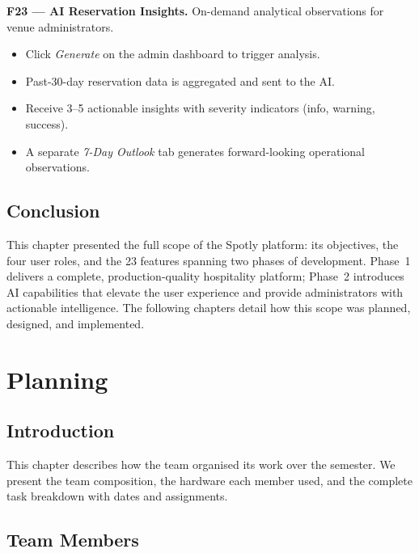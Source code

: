 \documentclass[12pt,a4paper,oneside]{report}
\begin{document}
\textbf{F23 --- AI Reservation Insights.}
On-demand analytical observations for venue administrators.
\begin{itemize}[leftmargin=1.5em, topsep=2pt, itemsep=1pt]
  \item Click \emph{Generate} on the admin dashboard to trigger analysis.
  \item Past-30-day reservation data is aggregated and sent to the AI.
  \item Receive 3--5 actionable insights with severity indicators (info,
        warning, success).
  \item A separate \emph{7-Day Outlook} tab generates forward-looking
        operational observations.
\end{itemize}

\section{Conclusion}

This chapter presented the full scope of the Spotly platform: its objectives,
the four user roles, and the 23 features spanning two phases of development.
Phase~1 delivers a complete, production-quality hospitality platform;
Phase~2 introduces AI capabilities that elevate the user experience and
provide administrators with actionable intelligence. The following chapters
detail how this scope was planned, designed, and implemented.


\chapter{Planning}

\section{Introduction}

This chapter describes how the team organised its work over the semester.
We present the team composition, the hardware each member used, and the
complete task breakdown with dates and assignments.

\section{Team Members}
\end{document}
